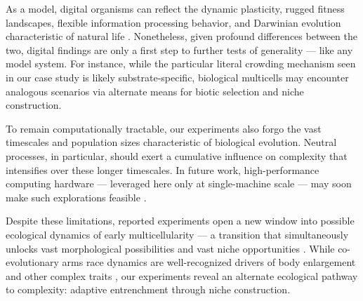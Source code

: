 As a model, digital organisms can reflect the dynamic plasticity, rugged fitness landscapes, flexible information processing behavior, and Darwinian evolution characteristic of natural life \citep{pennock2007models}.
Nonetheless, given profound differences between the two, digital findings are only a first step to further tests of generality \citep{Wilke2001,Codoer2006} --- like any model system.
For instance, while the particular literal crowding mechanism seen in our case study is likely substrate-specific, biological multicells may encounter analogous scenarios via alternate means for biotic selection and niche construction.

To remain computationally tractable, our experiments also forgo the vast timescales and population sizes characteristic of biological evolution.
Neutral processes, in particular, should exert a cumulative influence on complexity that intensifies over these longer timescales.
In future work, high-performance computing hardware --- leveraged here only at single-machine scale --- may soon make such explorations feasible \citep{ackley2014indefinitely,moreno2024trackable,heinemann2007artificial}.




Despite these limitations, reported experiments open a new window into possible ecological dynamics of early multicellularity --- a transition that simultaneously unlocks vast morphological possibilities and vast niche opportunities \citep{Carroll2001}.
While co-evolutionary arms race dynamics are well-recognized drivers of body enlargement and other complex traits \citep{Tong2022,Dawkins1979}, our experiments reveal an alternate ecological pathway to complexity: adaptive entrenchment through niche construction.

